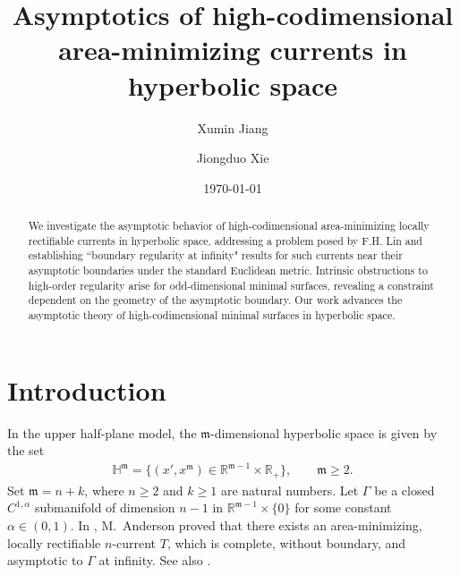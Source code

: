 \documentclass[11pt,reqno]{amsart}
\newcommand{\fm}{\mathfrak{m}}
\renewcommand{\geq}{\geqslant}
\theoremstyle{definition}
\numberwithin{equation}{section}
\begin{document}
\title{Asymptotics of high-codimensional area-minimizing currents in hyperbolic space
}


	

	
\author{Xumin Jiang}
\address{School of Sciences, Great Bay University, Dongguan 523000, China}

\author{Jiongduo Xie}
\address{School of Mathematical Sciences\\
Shanghai Jiao Tong University\\
Shanghai, 200240, China}
	
\date{\today}

\begin{abstract}
    We investigate the asymptotic behavior of high-codimensional area-minimizing locally rectifiable currents in hyperbolic space, addressing a problem posed by F.H. Lin \cite{Lin1989CPAM} and establishing     ``boundary regularity at infinity" results for such currents near their asymptotic boundaries under the standard Euclidean metric. Intrinsic obstructions to high-order regularity arise for odd-dimensional minimal surfaces, revealing a constraint dependent on the geometry of the asymptotic boundary. Our work advances the asymptotic theory of high-codimensional minimal surfaces in hyperbolic space.
\end{abstract}

\maketitle


\setcounter{tocdepth}{3}
\tableofcontents

\section{Introduction}
In the upper half-plane model, the $\fm$-dimensional hyperbolic space is given by the set
\begin{align}
    \mathbb{H}^\fm = \bigl\{ (x', x^\fm) \in \mathbb{R}^{\fm-1} \times \mathbb{R}_+ \bigr\}, \qquad \fm \geq 2.
\end{align}
Set $\fm = n+k$, where $n\geq 2$ and $k\geq 1$ are natural numbers. Let $\Gamma$ be a closed $C^{1,\alpha}$ submanifold of dimension $n-1$ in $\mathbb{R}^{\fm-1}\times\{0\}$ for some constant $\alpha\in(0,1)$. In \cite{Anderson1982}, M.\ Anderson proved that there exists an area-minimizing, locally rectifiable $n$-current $T$, which is complete, without boundary, and asymptotic to $\Gamma$ at infinity. See also \cite{Anderson1983}.
\end{document}

